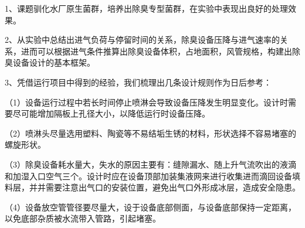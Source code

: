 1、课题驯化水厂原生菌群，培养出除臭专型菌群，在实验中表现出良好的处理效果。\par
2、从实验中总结出进气负荷与停留时间的关系，除臭设备压降与进气速率的关系，进而可以根据进气条件推算出除臭设备体积，占地面积，风管规格，构建出除臭设备设计的基本框架。\par
3、凭借运行项目中得到的经验，我们梳理出几条设计规则作为日后参考：\par
（1）设备运行过程中若长时间停止喷淋会导致设备压降发生明显变化。设计时需要尽可能增加隔板上孔径大小，以降低运行时设备压降。\par
（2）喷淋头尽量选用塑料、陶瓷等不易结垢生锈的材料，形状选择不容易堵塞的螺旋形状。\par
（3）除臭设备耗水量大，失水的原因主要有：缝隙漏水、随上升气流吹出的液滴和加湿入口空气三个。设计时应在设备顶部加装集液网来进行收集进而滴回设备填料层，并并需要注意出气口的安装位置，避免出气口外形成冰层，造成安全隐患。\par
（4）设备放空管管径要尽量大，设于设备底部侧面，与设备底部保持一定距离，以免底部杂质被水流带入管路，引起堵塞。\par

